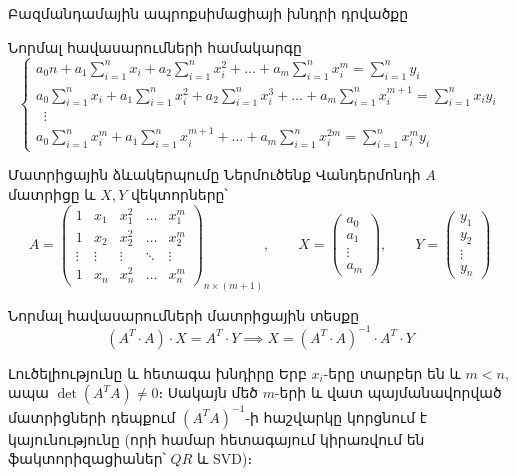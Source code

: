 \documentclass[aspectratio=169,11pt]{beamer}
\begin{document}
\begin{frame}[t]{Բազմանդամային ապրոքսիմացիայի խնդրի դրվածքը}
    \vspace{-0.15cm}
    \begin{block}{Նորմալ հավասարումների համակարգը}
        \small
        \setlength{\abovedisplayskip}{3pt}
        \setlength{\belowdisplayskip}{3pt}
        \[
        \begin{cases}
        a_0 n + a_1 \sum_{i=1}^n x_i + a_2 \sum_{i=1}^n x_i^2 + \dots + a_m \sum_{i=1}^n x_i^m = \sum_{i=1}^n y_i \\[3pt]
        a_0 \sum_{i=1}^n x_i + a_1 \sum_{i=1}^n x_i^2 + a_2 \sum_{i=1}^n x_i^3 + \dots + a_m \sum_{i=1}^n x_i^{m+1} = \sum_{i=1}^n x_i y_i \\[-2pt]
        \;\;\vdots \\[-2pt]
        a_0 \sum_{i=1}^n x_i^m + a_1 \sum_{i=1}^n x_i^{m+1} + \dots + a_m \sum_{i=1}^n x_i^{2m} = \sum_{i=1}^n x_i^m y_i
        \end{cases}
        \]
    \end{block}
\end{frame}

\begin{frame}{Մատրիցային ձևակերպումը}
    Ներմուծենք Վանդերմոնդի $A$ մատրիցը և $X, Y$ վեկտորները՝
    \small
    \[
    A =
    \begin{pmatrix}
    1 & x_1 & x_1^2 & \dots & x_1^m \\
    1 & x_2 & x_2^2 & \dots & x_2^m \\
    \vdots & \vdots & \vdots & \ddots & \vdots \\
    1 & x_n & x_n^2 & \dots & x_n^m
    \end{pmatrix}_{n \times (m+1)},
    \qquad
    X = \begin{pmatrix} a_0 \\ a_1 \\ \vdots \\ a_m \end{pmatrix},
    \qquad
    Y = \begin{pmatrix} y_1 \\ y_2 \\ \vdots \\ y_n \end{pmatrix}
    \]
    \normalsize
    \vspace{-0.3cm}
    \begin{block}{Նորմալ հավասարումների մատրիցային տեսքը}
        \[
        (A^T \cdot A) \cdot X = A^T \cdot Y \implies \boxed{X = (A^T \cdot A)^{-1} \cdot A^T \cdot Y}
        \]
    \end{block}

    \vspace{-0.15cm}
    \begin{alertblock}{Լուծելիությունը և հետագա խնդիրը}
        Երբ $x_i$-երը տարբեր են և $m < n$, ապա $\det(A^T A) \neq 0$։ Սակայն մեծ $m$-երի և վատ պայմանավորված մատրիցների դեպքում $(A^T A)^{-1}$-ի հաշվարկը կորցնում է կայունությունը (որի համար հետագայում կիրառվում են ֆակտորիզացիաներ՝ $QR$ և SVD)։
    \end{alertblock}
\end{frame}
\end{document}
